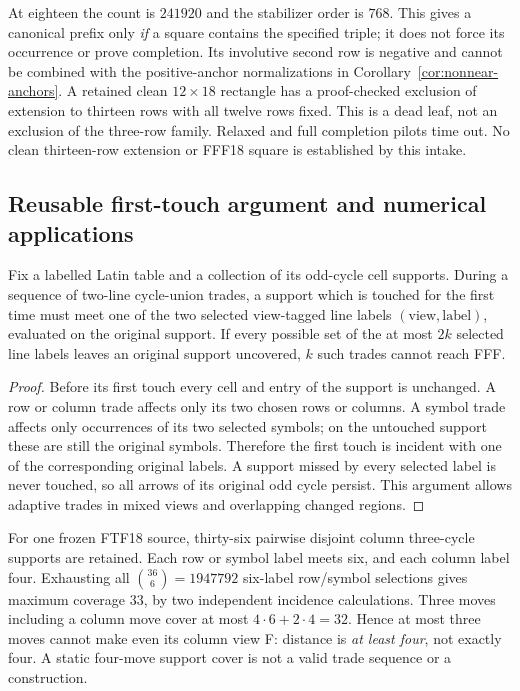 At eighteen the count is $241920$ and the stabilizer order is $768$.
This gives a canonical prefix only \emph{if} a square contains the
specified triple; it does not force its occurrence or prove completion.
Its involutive second row is negative and cannot be combined with the
positive-anchor normalizations in Corollary~\ref{cor:nonnear-anchors}.
A retained clean $12\times18$ rectangle has a proof-checked exclusion
of extension to thirteen rows with all twelve rows fixed. This is a
dead leaf, not an exclusion of the three-row family. Relaxed and full
completion pilots time out. No clean thirteen-row extension or FFF18
square is established by this intake.

\subsection{Reusable first-touch argument and numerical applications}
\begin{lemma}
Fix a labelled Latin table and a collection of its odd-cycle cell
supports. During a sequence of two-line cycle-union trades, a support
which is touched for the first time must meet one of the two selected
view-tagged line labels $(\text{view},\text{label})$, evaluated on the original
support. If every possible set of the at most $2k$ selected line
labels leaves an original support uncovered, $k$ such trades cannot
reach FFF.
\end{lemma}
\begin{proof}
Before its first touch every cell and entry of the support is unchanged.
A row or column trade affects only its two chosen rows or columns.
A symbol trade affects only occurrences of its two selected symbols;
on the untouched support these are still the original symbols.
Therefore the first touch is incident with one of the corresponding
original labels. A support missed by every selected label is never
touched, so all arrows of its original odd cycle persist. This argument
allows adaptive trades in mixed views and overlapping changed regions.
\end{proof}

For one frozen FTF18 source, thirty-six pairwise disjoint column
three-cycle supports are retained. Each row or symbol label meets
six, and each column label four. Exhausting all $\binom{36}{6}=1947792$
six-label row/symbol selections gives maximum coverage $33$, by two
independent incidence calculations. Three moves including a column
move cover at most $4\cdot6+2\cdot4=32$. Hence at most three moves
cannot make even its column view F: distance is \emph{at least four},
not exactly four. A static four-move support cover is not a valid
trade sequence or a construction.

